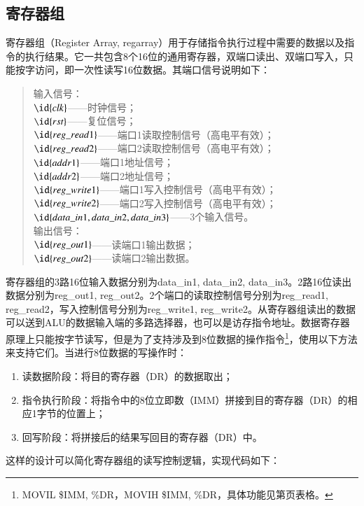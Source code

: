 \documentclass[titlepage, 11pt]{article}
\begin{document}
	\subsection{寄存器组}
		寄存器组（Register Array, regarray）用于存储指令执行过程中需要的数据以及指令的执行结果。它一共包含8个16位的通用寄存器，双端口读出、双端口写入，只能按字访问，即一次性读写16位数据。其端口信号说明如下：
		\begin{quote}
			输入信号：\\
			$\id{clk}$——时钟信号；\\
			$\id{rst}$——复位信号；\\
			$\id{reg\_read1}$——端口1读取控制信号（高电平有效）；\\
			$\id{reg\_read2}$——端口2读取控制信号（高电平有效）；\\
			$\id{addr1}$——端口1地址信号；\\
			$\id{addr2}$——端口2地址信号；\\
			$\id{reg\_write1}$——端口1写入控制信号（高电平有效）；\\
			$\id{reg\_write2}$——端口2写入控制信号（高电平有效）；\\
			$\id{data\_in1,data\_in2,data\_in3}$——3个输入信号。\\
			输出信号：\\
			$\id{reg\_out1}$——读端口1输出数据；\\
			$\id{reg\_out2}$——读端口2输出数据。	
		\end{quote}\par 
		寄存器组的3路16位输入数据分别为data\_in1, data\_in2, data\_in3。2路16位读出数据分别为reg\_out1, reg\_out2。2个端口的读取控制信号分别为reg\_read1, reg\_read2，写入控制信号分别为reg\_write1, reg\_write2。从寄存器组读出的数据可以送到ALU的数据输入端的多路选择器，也可以是访存指令地址。数据寄存器原理上只能按字节读写，但是为了支持涉及到8位数据的操作指令\footnote{MOVIL \$IMM, \%DR，MOVIH \$IMM, \%DR，具体功能见第页表格。}，使用以下方法来支持它们。当进行8位数据的写操作时：
		\begin{enumerate}
			\item 读数据阶段：将目的寄存器（DR）的数据取出；
			\item 指令执行阶段：将指令中的8位立即数（IMM）拼接到目的寄存器（DR）的相应1字节的位置上；
			\item 回写阶段：将拼接后的结果写回目的寄存器（DR）中。
		\end{enumerate}
		\par 这样的设计可以简化寄存器组的读写控制逻辑，实现代码如下：
\end{document}
